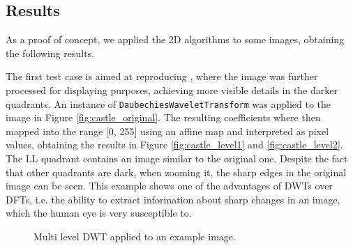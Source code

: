 \subsection{Results}
As a proof of concept, we applied the 2D algorithms to some images, obtaining the following results.

The first test case is aimed at reproducing \cite{castle}, where the image was further processed for displaying purposes, achieving more visible details in the darker quadrants. An instance of \texttt{Daubechies\-Wavelet\-Transform} was applied to the image in Figure \ref{fig:castle_original}. The resulting coefficients where then mapped into the range [0, 255] using an affine map and interpreted as pixel values, obtaining the results in Figure \ref{fig:castle_level1} and \ref{fig:castle_level2}. The LL quadrant contains an image similar to the original one. Despite the fact that other quadrants are dark, when zooming it, the sharp edges in the original image can be seen. This example shows one of the advantages of DWTs over DFTs, i.e. the ability to extract information about sharp changes in an image, which the human eye is very susceptible to.

\begin{figure}[ht]
    \centering
    \caption{Multi level DWT applied to an example image.}
    \label{fig:wavelet_2d}
\end{figure}

